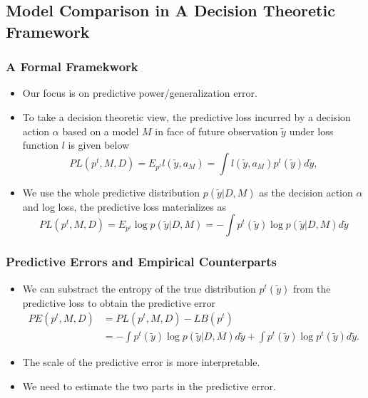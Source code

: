 \documentclass[xetex,mathserif,serif]{beamer}
\begin{document}
\subsection{Model Comparison in A Decision Theoretic Framework}
\begin{frame}
  \frametitle{A Formal Framekwork}
  \begin{itemize}
  \item Our focus is on predictive power/generalization error.
  \item To take a decision theoretic view, the predictive loss incurred by a
    decision action $\alpha$ based on a model $M$ in face of future observation
    $\tilde y$ under loss function $l$ is given below
    \begin{equation*}
      PL(p^t, M, D)=E_{p^t}l(\tilde y, a_M)=\int l(\tilde y, a_M) p^t(\tilde y)d\tilde y,
    \end{equation*}
  \item We use the whole predictive distribution $p(\tilde y|D,M)$ as the
    decision action $\alpha$ and log loss, the predictive loss materializes as
    \begin{equation*}
      PL(p^t, M, D)=E_{p^t}\log p(\tilde y|D, M)=-\int p^t(\tilde y) \log p(\tilde y|D, M) d\tilde y
    \end{equation*}
  \end{itemize}
\end{frame}

\begin{frame}
  \frametitle{Predictive Errors and Empirical Counterparts}
  \begin{itemize}
  \item We can substract the entropy of the true distribution $p^t(\tilde y)$
    from the predictive loss to obtain the predictive error
    \begin{align*}
      PE(p^t, M, D)&= PL(p^t, M, D) - LB(p^t) \\  
      &=-\int p^t(\tilde y) \log p(\tilde y|D, M) d\tilde y+\int p^t(\tilde y) \log p^t(\tilde y) d\tilde y.
    \end{align*}
  \item The scale of the predictive error is more interpretable.
  \item We need to estimate the two parts in the predictive error.
  \end{itemize}
\end{frame}
\end{document}
